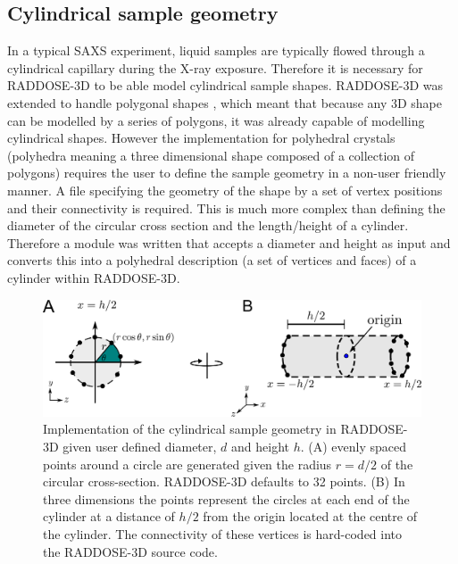 \subsection{Cylindrical sample geometry}
\label{sub:Cylindrical sample geometry}
In a typical SAXS experiment, liquid samples are typically flowed through a cylindrical capillary during the X-ray exposure.
Therefore it is necessary for RADDOSE-3D to be able model cylindrical sample shapes.
RADDOSE-3D was extended to handle polygonal shapes \cite{bury2015radiation}, which meant that because any 3D shape can be modelled by a series of polygons, it was already capable of modelling cylindrical shapes.
However the implementation for polyhedral crystals (polyhedra meaning a three dimensional shape composed of a collection of polygons) requires the user to define the sample geometry in a non-user friendly manner.
A file specifying the geometry of the shape by a set of vertex positions and their connectivity is required.
This is much more complex than defining the diameter of the circular cross section and the length/height of a cylinder.
Therefore a module was written that accepts a diameter and height as input and converts this into a polyhedral description (a set of vertices and faces) of a cylinder within RADDOSE-3D.
\begin{figure}
    \centering
    \includegraphics[width=1\textwidth]{figures/saxs/cylinder_implementation.pdf}
    \caption{Implementation of the cylindrical sample geometry in RADDOSE-3D given user defined diameter, $d$ and height $h$. (A) evenly spaced points around a circle are generated given the radius $r = d/2$ of the circular cross-section. RADDOSE-3D defaults to 32 points. (B) In three dimensions the points represent the circles at each end of the cylinder at a distance of $h/2$ from the origin located at the centre of the cylinder. The connectivity of these vertices is hard-coded into the RADDOSE-3D source code.}
    \label{fig:Cylindrical implementation}
\end{figure}

